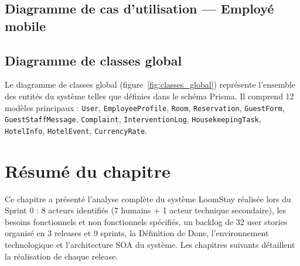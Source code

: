 \subsection{Diagramme de cas d'utilisation — Employé mobile}


\subsection{Diagramme de classes global}

Le diagramme de classes global (figure~\ref{fig:classes_global}) représente l'ensemble des entités du système telles que définies dans le schéma Prisma. Il comprend 12 modèles principaux : \texttt{User}, \texttt{EmployeeProfile}, \texttt{Room}, \texttt{Reservation}, \texttt{GuestForm}, \texttt{GuestStaffMessage}, \texttt{Complaint}, \texttt{InterventionLog}, \texttt{HousekeepingTask}, \texttt{HotelInfo}, \texttt{HotelEvent}, \texttt{CurrencyRate}.

\label{fig:classes_global}

\section*{Résumé du chapitre}

Ce chapitre a présenté l'analyse complète du système LoomStay réalisée lors du Sprint 0 : 8 acteurs identifiés (7 humains + 1 acteur technique secondaire), les besoins fonctionnels et non fonctionnels spécifiés, un backlog de 32 user stories organisé en 3 releases et 9 sprints, la Définition de Done, l'environnement technologique et l'architecture SOA du système. Les chapitres suivants détaillent la réalisation de chaque release.

